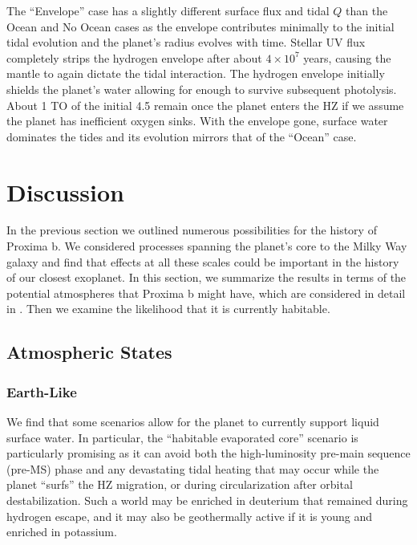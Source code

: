 \documentclass[preprint,12pt]{aastex}
\begin{document}
The ``Envelope'' case has a slightly different surface flux and tidal $Q$
than the Ocean and No Ocean cases as the envelope contributes
minimally to the initial tidal evolution and the planet's radius
evolves with time.  Stellar UV flux completely strips the
hydrogen envelope after about $4 \times 10^7$ years, causing the mantle
to again dictate the tidal interaction.  The hydrogen envelope
initially shields the planet's water allowing for enough to survive
subsequent photolysis. About 1 TO of the initial 4.5
remain once the planet enters the HZ if we assume the planet has
inefficient oxygen sinks.  With the envelope gone, surface water
dominates the tides and its evolution mirrors that of the ``Ocean'' case.

\section{Discussion\label{sec:disc}}

In the previous section we outlined numerous possibilities for the
history of Proxima b. We considered processes spanning the planet's
core to the Milky Way galaxy and find that effects at all these scales
could be important in the history of our closest exoplanet. In this
section, we summarize the results in terms of the potential
atmospheres that Proxima b might have, which are considered in
detail in \citep{Meadows16}. Then we examine the likelihood that it is
currently habitable.

\subsection{Atmospheric States}
\label{sec:results:atmstates}

\subsubsection{Earth-Like}
\label{sec:results:atmstates:earthlike}

We find that some scenarios allow for the planet to currently support liquid
surface water. In particular, the ``habitable evaporated core'' scenario
\citep{Luger15} is particularly promising as it can avoid both the
high-luminosity pre-main sequence (pre-MS) phase and any devastating tidal
heating that may occur while the planet ``surfs'' the HZ migration, or
during circularization after orbital destabilization. Such a world may
be enriched in deuterium that remained during hydrogen escape, and it
may also be geothermally active if it is young and enriched in
potassium.
\end{document}
